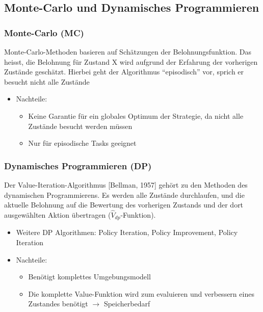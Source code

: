 \subsection{Monte-Carlo und Dynamisches Programmieren}

\begin{frame}
  \frametitle{Monte-Carlo (MC)}
	Monte-Carlo-Methoden basieren auf Schätzungen der Belohnungsfunktion. Das
	heisst, die Belohnung für Zustand X wird aufgrund der Erfahrung der vorherigen
	Zustände geschätzt. Hierbei geht der Algorithmus "`episodisch"' vor, sprich er
	besucht nicht alle Zustände
	\begin{itemize}
      \item Nachteile:
      	\begin{itemize}
            \item Keine Garantie für ein globales Optimum der Strategie, da
            nicht alle Zustände besucht werden müssen
            \item Nur für episodische Tasks geeignet
         \end{itemize}
    \end{itemize}
\end{frame}


\begin{frame}
  \frametitle{Dynamisches Programmieren (DP)}
Der Value-Iteration-Algorithmus [Bellman, 1957] gehört zu den Methoden des
dynamischen Programmierens. Es werden alle Zustände durchlaufen, und die
aktuelle Belohnung auf die Bewertung des vorherigen Zustands und der dort
ausgewählten Aktion übertragen ($\hat V_{dp}$-Funktion).
	\begin{itemize}
      \item Weitere DP Algorithmen: Policy Iteration, Policy Improvement, Policy
      Iteration
      \item Nachteile:
      	\begin{itemize}
            \item Benötigt komplettes Umgebungsmodell
            \item Die komplette Value-Funktion wird zum evaluieren und
            verbessern eines Zustandes benötigt $\rightarrow$ Speicherbedarf
         \end{itemize}
    \end{itemize}
\end{frame}
